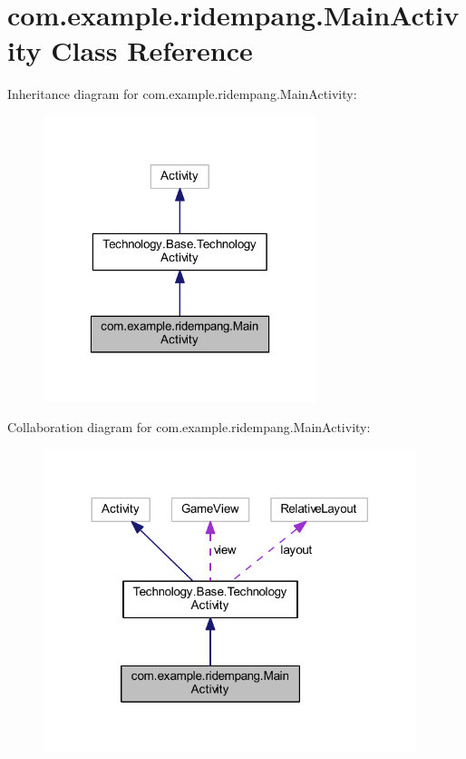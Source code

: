 \hypertarget{classcom_1_1example_1_1ridempang_1_1_main_activity}{\section{com.\-example.\-ridempang.\-Main\-Activity Class Reference}
\label{classcom_1_1example_1_1ridempang_1_1_main_activity}
}


Inheritance diagram for com.\-example.\-ridempang.\-Main\-Activity\-:
\nopagebreak
\begin{figure}[H]
\begin{center}
\leavevmode
\includegraphics[width=226pt]{classcom_1_1example_1_1ridempang_1_1_main_activity__inherit__graph}
\end{center}
\end{figure}


Collaboration diagram for com.\-example.\-ridempang.\-Main\-Activity\-:
\nopagebreak
\begin{figure}[H]
\begin{center}
\leavevmode
\includegraphics[width=308pt]{classcom_1_1example_1_1ridempang_1_1_main_activity__coll__graph}
\end{center}
\end{figure}
